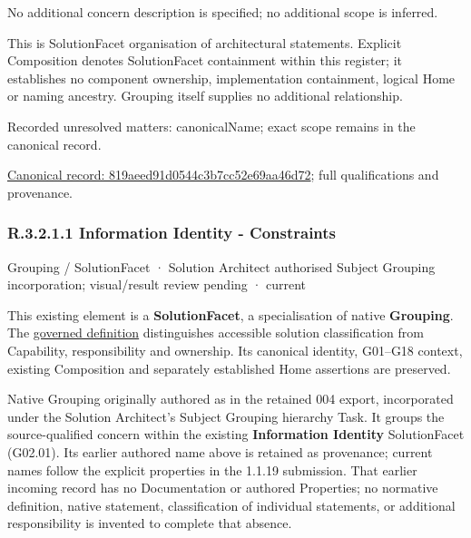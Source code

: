 No additional concern description is specified; no additional scope is inferred.



This is SolutionFacet organisation of architectural statements. Explicit Composition denotes SolutionFacet containment within this register; it establishes no component ownership, implementation containment, logical Home or naming ancestry. Grouping itself supplies no additional relationship.


{\small Recorded unresolved matters: canonicalName; exact scope remains in the canonical record.}\par
{\footnotesize \href{../../../../../../../continuum/grouping/819aeed91d0544c3b7cc52e69aa46d72.md}{Canonical record: 819aeed91d0544c3b7cc52e69aa46d72}; full qualifications and provenance.}\par
\subsubsection*{R.3.2.1.1 Information Identity - Constraints}
\label{navigation:R.3.2.1.1}

\label{element:9c7c9de7ffc0457d87cf52548bca70ca}
{\small Grouping / SolutionFacet · Solution Architect authorised Subject Grouping incorporation; visual/result review pending · current}\par

This existing element is a \textbf{SolutionFacet}, a specialisation of native
\textbf{Grouping}. The \href{\detokenize{../../../../../../../governance/continuum-representation.md#solutionfacet-classification--1119-candidate}}{governed definition}
distinguishes accessible solution classification from Capability, responsibility
and ownership. Its canonical identity, G01–G18 context, existing Composition
and separately established Home assertions are preserved.



Native Grouping originally authored as \texttt{} in the retained 004 export,
incorporated under the Solution Architect's Subject Grouping hierarchy Task.
It groups the source-qualified \texttt{} concern within
the existing \textbf{Information Identity} SolutionFacet (G02.01). Its earlier authored name above is retained as provenance; current names
follow the explicit properties in the 1.1.19 submission.
That earlier incoming record has no Documentation or authored Properties; no normative
definition, native statement, classification of individual statements, or
additional responsibility is invented to complete that absence.



